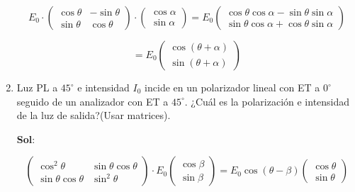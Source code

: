 \documentclass[12pt,a4paper]{article}
\begin{document}
\begin{enumerate}
\begin{equation*}
    E_0 \cdot \left(\begin{array}{cc}
         \cos{\theta} & -\sin{\theta}  \\
         \sin{\theta} & \cos{\theta}\end{array}\right) \cdot \left(\begin{array}{cc}
         \cos{\alpha}  \\
         \sin{\alpha} \end{array}\right) = E_0 \left(\begin{array}{cc}
         \cos{\theta}\cos{\alpha}-\sin{\theta}\sin{\alpha}  \\
         \sin{\theta}\cos{\alpha}+\cos{\theta}\sin{\alpha}   \end{array}\right) 
\end{equation*}

\begin{equation*}
    = E_0 \left(\begin{array}{cc}
         \cos{(\theta +\alpha)}  \\
         \sin{(\theta +\alpha)} \end{array}\right)
\end{equation*}










\item Luz PL a $45^{\circ}$ e intensidad $I_0$ incide en un polarizador lineal con ET a $0^{\circ}$ seguido de un analizador con ET a $45^{\circ}$. ¿Cuál es la polarización e intensidad de la luz de salida?(Usar matrices).

\textbf{Sol}:

\begin{equation*}
    \left(\begin{array}{cc}
        \cos^{2}{\theta} & \sin{\theta} \cos{\theta}  \\
        \sin{\theta}\cos{\theta} & \sin^{2}{\theta} 
    \end{array}\right) \cdot E_0  \left(\begin{array}{c}
          \cos{\beta} \\
          \sin{\beta}
    \end{array}\right)=E_0 \cos{(\theta - \beta)} \left(\begin{array}{c}
         \cos{\theta} \\
         \sin{\theta} 
    \end{array}\right)
\end{equation*}


\end{enumerate}
\end{document}

